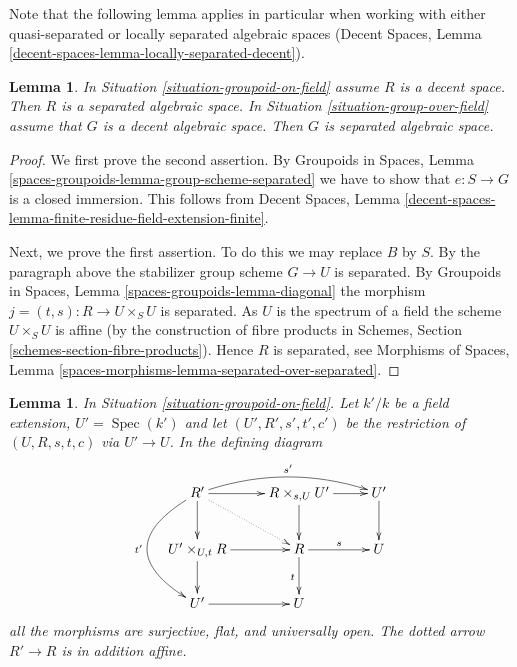 \documentclass{stacks-project}
\theoremstyle{plain}
\newtheorem{lemma}[subsection]{Lemma}
\theoremstyle{definition}
\theoremstyle{remark}
\numberwithin{equation}{subsection}
\def\Spec{\mathop{\mathrm{Spec}}}
\begin{document}
\noindent
Note that the following lemma applies in particular when working
with either quasi-separated or locally separated algebraic spaces
(Decent Spaces, Lemma \ref{decent-spaces-lemma-locally-separated-decent}).

\begin{lemma}
\label{lemma-group-scheme-over-field-separated}
In Situation \ref{situation-groupoid-on-field}
assume $R$ is a decent space. Then $R$ is a separated algebraic space.
In Situation \ref{situation-group-over-field} assume that
$G$ is a decent algebraic space. Then $G$ is separated algebraic space.
\end{lemma}

\begin{proof}
We first prove the second assertion. By Groupoids in Spaces,
Lemma \ref{spaces-groupoids-lemma-group-scheme-separated}
we have to show that $e : S \to G$ is a closed immersion.
This follows from Decent Spaces, Lemma
\ref{decent-spaces-lemma-finite-residue-field-extension-finite}.

\medskip\noindent
Next, we prove the first assertion. To do this we may replace $B$ by $S$.
By the paragraph above the stabilizer group scheme $G \to U$ is separated. By
Groupoids in Spaces, Lemma \ref{spaces-groupoids-lemma-diagonal}
the morphism $j = (t, s) : R \to U \times_S U$ is separated.
As $U$ is the spectrum of a field the scheme
$U \times_S U$ is affine (by the construction of fibre products in
Schemes, Section \ref{schemes-section-fibre-products}).
Hence $R$ is separated, see
Morphisms of Spaces, Lemma
\ref{spaces-morphisms-lemma-separated-over-separated}.
\end{proof}

\begin{lemma}
\label{lemma-restrict-groupoid-on-field}
In
Situation \ref{situation-groupoid-on-field}.
Let $k'/k$ be a field extension, $U' = \Spec(k')$
and let $(U', R', s', t', c')$ be the restriction of
$(U, R, s, t, c)$ via $U' \to U$. In the defining diagram
$$
\xymatrix{
R' \ar[d] \ar[r] \ar@/_3pc/[dd]_{t'} \ar@/^1pc/[rr]^{s'} \ar@{..>}[rd] &
R \times_{s, U} U' \ar[r] \ar[d] &
U' \ar[d] \\
U' \times_{U, t} R \ar[d] \ar[r] &
R \ar[r]^s \ar[d]_t &
U \\
U' \ar[r] &
U
}
$$
all the morphisms are surjective, flat, and universally open.
The dotted arrow $R' \to R$ is in addition affine.
\end{lemma}
\end{document}
